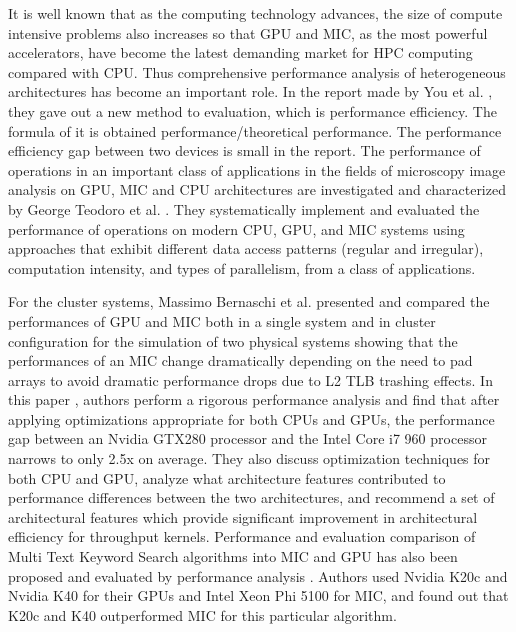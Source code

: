 It is well known that as the computing technology advances, the size of compute intensive problems also increases so that GPU and MIC, as the most powerful accelerators, have become the latest demanding market for HPC computing compared with CPU. Thus comprehensive performance analysis of heterogeneous architectures has become an important role. In the report made by You et al. \cite{R:8}, they gave out a new method to evaluation, which is performance efficiency. The formula of it is obtained performance/theoretical performance. The performance efficiency gap between two devices is small in the report. The performance of operations in an important class of applications in the fields of microscopy image analysis on GPU, MIC and CPU architectures are investigated and characterized by George Teodoro et al. \cite{R:9}. They systematically implement and evaluated the performance of operations on modern CPU, GPU, and MIC systems using approaches that exhibit different data access patterns (regular and irregular), computation intensity, and types of parallelism, from a class of applications. 

For the cluster systems, Massimo Bernaschi et al. \cite{R:10} presented and compared the performances of GPU and MIC both in a single system and in cluster configuration for the simulation of two physical systems showing that the performances of an MIC change dramatically depending on the need to pad arrays to avoid dramatic performance drops due to L2 TLB trashing effects. In this paper \cite{R:11}, authors perform a rigorous performance analysis and find that after applying optimizations appropriate for both CPUs and GPUs, the performance gap between an Nvidia GTX280 processor and the Intel Core i7 960 processor narrows to only 2.5x on average. They also discuss optimization techniques for both CPU and GPU, analyze what architecture features contributed to performance differences between the two architectures, and recommend a set of architectural features which provide significant improvement in architectural efficiency for throughput kernels. Performance and evaluation comparison of Multi Text Keyword Search algorithms into MIC and GPU has also been proposed and evaluated by performance analysis \cite{R:12}. Authors used Nvidia K20c and Nvidia K40 for their GPUs and Intel Xeon Phi 5100 for MIC, and found out that K20c and K40 outperformed MIC for this particular algorithm. 

